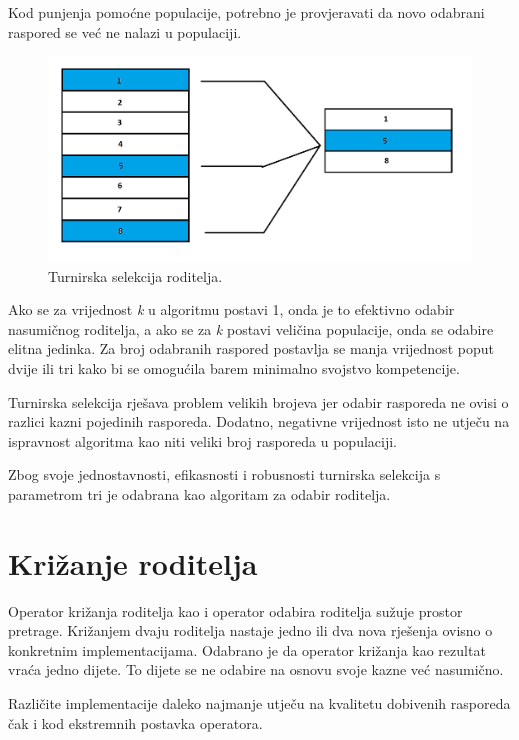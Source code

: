 \documentclass[times, utf8, zavrsni]{fer}
\begin{document}
Kod punjenja pomoćne populacije, potrebno je provjeravati da novo odabrani raspored se već ne nalazi u populaciji.

\begin{figure}[htb]
\centering
\includegraphics[width=14cm]{images/turnir.png}
\caption{Turnirska selekcija roditelja.}
\label{fig:turnir}
\end{figure}

Ako se za vrijednost \emph{k} u algoritmu postavi 1, onda je to efektivno odabir nasumičnog roditelja, a ako se za \emph{k} postavi veličina populacije, onda se odabire elitna jedinka. Za broj odabranih raspored postavlja se manja vrijednost poput dvije ili tri kako bi se omogućila barem minimalno svojstvo kompetencije.

Turnirska selekcija rješava problem velikih brojeva jer odabir rasporeda ne ovisi o razlici kazni pojedinih rasporeda. Dodatno, negativne vrijednost isto ne utječu na ispravnost algoritma kao niti veliki broj rasporeda u populaciji.

Zbog svoje jednostavnosti, efikasnosti i robusnosti turnirska selekcija s parametrom tri je odabrana kao algoritam za odabir roditelja.

\section{Križanje roditelja}

Operator križanja roditelja kao i operator odabira roditelja sužuje prostor pretrage. Križanjem dvaju roditelja nastaje jedno ili dva nova rješenja  ovisno o konkretnim implementacijama. Odabrano je da operator križanja kao rezultat vraća jedno dijete. To dijete se ne odabire na osnovu svoje kazne već nasumično.

Različite implementacije daleko najmanje utječu na kvalitetu dobivenih rasporeda čak i kod ekstremnih postavka operatora.
\end{document}
